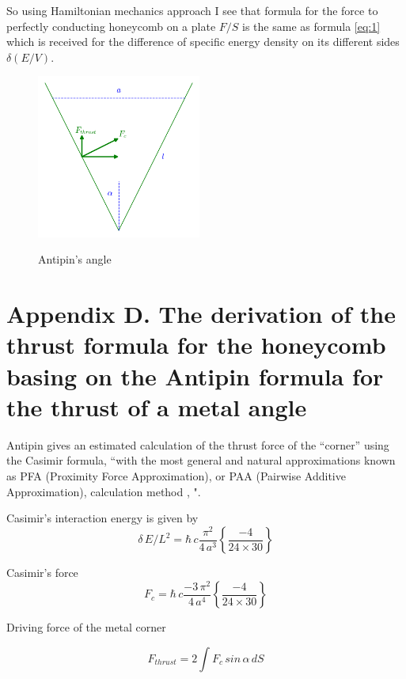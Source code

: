 \documentclass[11pt]{article}
\begin{document}
    So using Hamiltonian mechanics approach I see that formula for the force
to perfectly conducting honeycomb on a plate \({F}/{S}\) is the same as formula \ref{eq:1}
which is received for the difference of specific energy density on its
different sides \(\delta\left({E}/{V}\right)\).

    \begin{figure}
\begin{center}
\includegraphics[width=0.48\textwidth]{Antipins_angle_en.png}
\caption{}{Antipin's angle}
\end{center}
\label{fig:Antipins_angle}
\end{figure}

    \section{Appendix D. The derivation of the thrust formula for the
honeycomb basing on the Antipin formula for the thrust of a metal
angle}\label{appendix-d.-the-derivation-of-the-thrust-formula-for-the-honeycomb-basing-on-the-antipin-formula-for-the-thrust-of-a-metal-angle}

    Antipin \cite{Antipin2012} gives an estimated calculation of the thrust
force of the ``corner'' using the Casimir formula, ``with the most
general and natural approximations known as PFA (Proximity Force
Approximation), or PAA (Pairwise Additive Approximation), calculation
method \cite{Intravaia2013}, \cite{Rodriguez2011}".

Casimir's interaction energy is given by
\[\delta\,E/L^2 = \hbar\,c\frac{\pi^2}{4\,a^3}\left\{\frac{-4}{24\times30}\right\}\]

Casimir's force
\[F_{c} = \hbar\,c\frac{-3\,\pi^2}{4\,a^4}\left\{\frac{-4}{24\times30}\right\}\]

Driving force of the metal corner

\[F_{thrust} = 2 \int F_{c} \, sin\, \alpha \,dS\]
\end{document}
